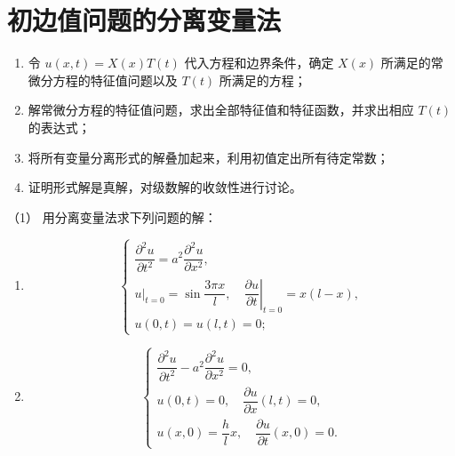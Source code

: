 \section{初边值问题的分离变量法}
\begin{proposition}[分离变量法的解题步骤]
\begin{enumerate}
  \item 令 \( u(x,t)=X(x)T(t) \) 代入方程和边界条件，确定 \( X(x) \) 所满足的常微分方程的特征值问题以及 \( T(t) \) 所满足的方程；
  \item 解常微分方程的特征值问题，求出全部特征值和特征函数，并求出相应 \( T(t) \) 的表达式；
  \item 将所有变量分离形式的解叠加起来，利用初值定出所有待定常数；
  \item 证明形式解是真解，对级数解的收敛性进行讨论。
\end{enumerate}
\end{proposition}
\begin{exercise}（1）
用分离变量法求下列问题的解：
\begin{enumerate}
  \item 
  \[
  \begin{cases}
  \dfrac{\partial^{2} u}{\partial t^{2}} 
  = a^{2} \dfrac{\partial^{2} u}{\partial x^{2}}, \\[6pt]
  u\big|_{t=0} = \sin \dfrac{3\pi x}{l}, \quad 
  \left.\dfrac{\partial u}{\partial t}\right|_{t=0} = x(l-x), \\[6pt]
  u(0,t) = u(l,t) = 0 ;
  \end{cases}
  \]

  \item
  \[
  \begin{cases}
  \dfrac{\partial^{2} u}{\partial t^{2}} 
  - a^{2} \dfrac{\partial^{2} u}{\partial x^{2}} = 0, \\[6pt]
  u(0,t) = 0, \quad 
  \dfrac{\partial u}{\partial x}(l,t) = 0, \\[6pt]
  u(x,0) = \dfrac{h}{l}x, \quad 
  \dfrac{\partial u}{\partial t}(x,0) = 0 .
  \end{cases}
  \]
\end{enumerate}
\end{exercise}

